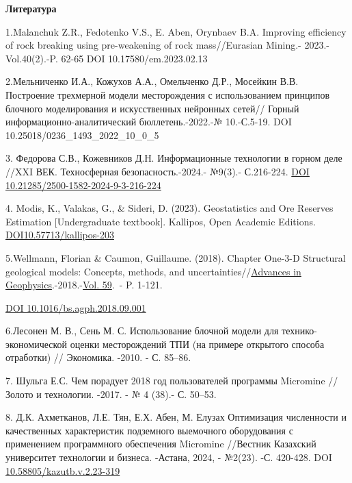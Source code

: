 \begin{center}
{\bfseries Литература}
\end{center}
\begin{references}

1.Malanchuk Z.R., Fedotenko V.S., E. Aben, Orynbaev B.A. Improving
efficiency of rock breaking using pre-weakening of rock mass//Eurasian
Mining.- 2023.-Vol.40(2).-P. 62-65 \linebreak DOI 10.17580/em.2023.02.13

2.Мельниченко И.А., Кожухов А.А., Омельченко Д.Р., Мосейкин В.В.
Построение трехмерной модели месторождения с использованием принципов
блочного моделирования и искусственных нейронных сетей// Горный
информационно-аналитический бюллетень.-2022.-№ 10.-С.5-19. \linebreak DOI
10.25018/0236\_1493\_2022\_10\_0\_5

3. Федорова С.В., Кожевников Д.Н. Информационные технологии в горном
деле //XXI ВЕК. Техносферная безопасность.-2024.- №9(3).- С.216-224.
\href{http://dx.doi.org/10.21285/2500-1582-2024-9-3-216-224}{DOI
10.21285/2500-1582-2024-9-3-216-224}

4. Modis, K., Valakas, G., \& Sideri, D. (2023). Geostatistics and Ore
Reserves Estimation {[}Undergraduate textbook{]}. Kallipos, Open
Academic Editions.
\href{http://dx.doi.org/10.57713/kallipos-203}{DOI10.57713/kallipos-203}

5.Wellmann, Florian \& Caumon, Guillaume. (2018). Chapter One-3-D
Structural geological models: \linebreak Concepts, methods, and uncertainties//\href{https://www.sciencedirect.com/bookseries/advances-in-geophysics}{Advances
in Geophysics}.-2018.-\href{https://www.sciencedirect.com/bookseries/advances-in-geophysics/vol/59/suppl/C}{Vol.
59}.~- P. 1-121. 

\href{http://dx.doi.org/10.1016/bs.agph.2018.09.001}{DOI
10.1016/bs.agph.2018.09.001} 

6.Лесонен М. В., Сень М. С. Использование блочной модели для
технико-экономической оценки месторождений ТПИ (на примере открытого
способа отработки) // Экономика. -2010. - С. 85--86.

7. Шульга Е.С. Чем порадует 2018 год пользователей программы Micromine
// Золото и технологии. -2017. - № 4 (38).- С. 50--53.

8. Д.К. Ахметканов, Л.Е. Тян, Е.Х. Абен, М. Елузах Оптимизация
численности и качественных характеристик подземного выемочного
оборудования с применением программного обеспечения Micromine //Вестник
Казахский университет технологии и бизнеса. -Астана, 2024, - №2(23). -С.
420-428. DOI \href{https://doi.org/10.58805/kazutb.v.2.23-319}{10.58805/kazutb.v.2.23-319}


\end{references}
